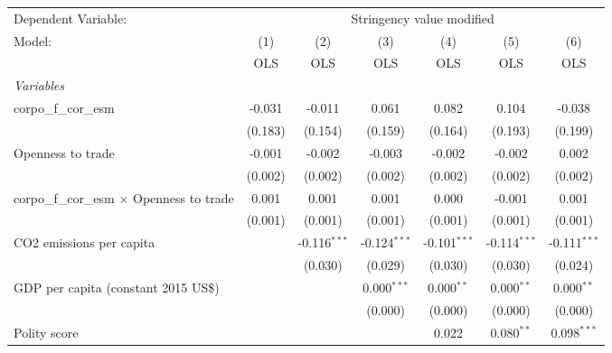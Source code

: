 
\begingroup
\centering
\begin{tabular}{lcccccc}
   \toprule
   Dependent Variable: & \multicolumn{6}{c}{Stringency value modified}\\
   Model:                                            & (1)     & (2)            & (3)            & (4)            & (5)            & (6)\\  
                                                     &  OLS    & OLS            & OLS            & OLS            & OLS            & OLS\\  
   \midrule
   \emph{Variables}\\
   corpo\_f\_cor\_esm                                & -0.031  & -0.011         & 0.061          & 0.082          & 0.104          & -0.038\\   
                                                     & (0.183) & (0.154)        & (0.159)        & (0.164)        & (0.193)        & (0.199)\\   
   Openness to trade                                 & -0.001  & -0.002         & -0.003         & -0.002         & -0.002         & 0.002\\   
                                                     & (0.002) & (0.002)        & (0.002)        & (0.002)        & (0.002)        & (0.002)\\   
   corpo\_f\_cor\_esm $\times$ Openness to trade     & 0.001   & 0.001          & 0.001          & 0.000          & -0.001         & 0.001\\   
                                                     & (0.001) & (0.001)        & (0.001)        & (0.001)        & (0.001)        & (0.001)\\   
   CO2 emissions per capita                          &         & -0.116$^{***}$ & -0.124$^{***}$ & -0.101$^{***}$ & -0.114$^{***}$ & -0.111$^{***}$\\   
                                                     &         & (0.030)        & (0.029)        & (0.030)        & (0.030)        & (0.024)\\   
   GDP per capita (constant 2015 US\$)               &         &                & 0.000$^{***}$  & 0.000$^{**}$   & 0.000$^{**}$   & 0.000$^{**}$\\   
                                                     &         &                & (0.000)        & (0.000)        & (0.000)        & (0.000)\\   
   Polity score                                      &         &                &                & 0.022          & 0.080$^{**}$   & 0.098$^{***}$\\   

\end{tabular}
